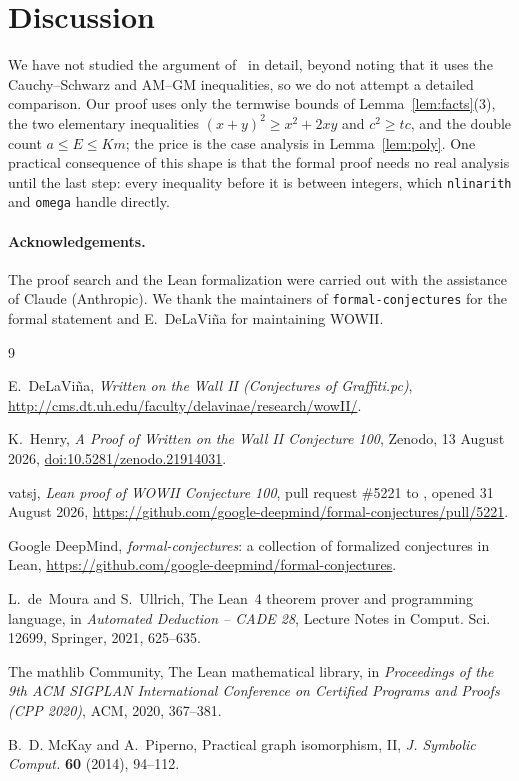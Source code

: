 \documentclass[11pt]{article}
\theoremstyle{definition}
\theoremstyle{remark}
\begin{document}
\section{Discussion}

We have not studied the argument of~\cite{henry} in detail, beyond noting
that it uses the Cauchy--Schwarz and AM--GM inequalities, so we do not
attempt a detailed comparison. Our proof uses only the termwise bounds of
Lemma~\ref{lem:facts}(3), the two elementary inequalities
$(x+y)^2 \ge x^2 + 2xy$ and $c^2 \ge tc$, and the double count
$a \le E \le Km$; the price is the case analysis in Lemma~\ref{lem:poly}.
One practical consequence of this shape is that the formal proof needs no
real analysis until the last step: every inequality before it is between
integers, which \texttt{nlinarith} and \texttt{omega} handle directly.

\paragraph{Acknowledgements.}
The proof search and the Lean formalization were carried out with the
assistance of Claude (Anthropic). We thank the maintainers of
\texttt{formal-conjectures} for the formal statement and E.~DeLaVi\~na for
maintaining WOWII.

\begin{thebibliography}{9}

E.~DeLaVi\~na,
\emph{Written on the Wall II (Conjectures of Graffiti.pc)},
\url{http://cms.dt.uh.edu/faculty/delavinae/research/wowII/}.

K.~Henry,
\emph{A Proof of Written on the Wall II Conjecture 100},
Zenodo, 13 August 2026,
\href{https://doi.org/10.5281/zenodo.21914031}{doi:10.5281/zenodo.21914031}.

vatsj,
\emph{Lean proof of WOWII Conjecture 100},
pull request \#5221 to ,
opened 31 August 2026,
\url{https://github.com/google-deepmind/formal-conjectures/pull/5221}.

Google DeepMind,
\emph{formal-conjectures}: a collection of formalized conjectures in Lean,
\url{https://github.com/google-deepmind/formal-conjectures}.

L.~de~Moura and S.~Ullrich,
The Lean~4 theorem prover and programming language,
in \emph{Automated Deduction -- CADE 28}, Lecture Notes in Comput. Sci.
12699, Springer, 2021, 625--635.

The mathlib Community,
The Lean mathematical library,
in \emph{Proceedings of the 9th ACM SIGPLAN International Conference on
Certified Programs and Proofs (CPP 2020)}, ACM, 2020, 367--381.

B.~D. McKay and A.~Piperno,
Practical graph isomorphism, II,
\emph{J. Symbolic Comput.} \textbf{60} (2014), 94--112.

\end{thebibliography}
\end{document}
